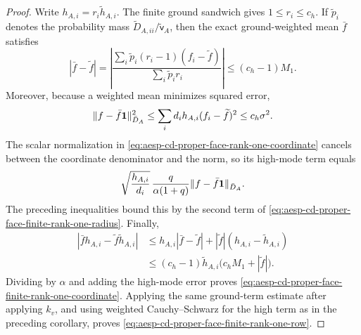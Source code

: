 \begin{proof}
Write \(h_{A,i}=r_i\widetilde h_{A,i}\).  The finite ground sandwich gives
\(1\leq r_i\leq c_h\).  If \(\widetilde p_i\) denotes the probability mass
\(\widetilde D_{A,ii}/\widetilde{\mathsf v}_A\), then the exact ground-weighted
mean \(\bar f\) satisfies
\begin{equation*}
 |\bar f-\widetilde f|
 =\left|
 \frac{\sum_i\widetilde p_i(r_i-1)(f_i-\widetilde f)}
      {\sum_i\widetilde p_i r_i}
 \right|
 \leq(c_h-1)M_1.
\end{equation*}
Moreover, because a weighted mean minimizes squared error,
\begin{equation*}
 \lVert f-\bar f\mathbf{1}\rVert_{\bar D_A}^2
 \leq\sum_i d_ih_{A,i}(f_i-\widetilde f)^2
 \leq c_h\sigma^2.
\end{equation*}
The scalar normalization in
\cref{eq:aesp-cd-proper-face-rank-one-coordinate} cancels between the
coordinate denominator and the norm, so its high-mode term equals
\begin{equation*}
 \sqrt{\frac{h_{A,i}}{d_i}}\,
 \frac{q}{\alpha(1+q)}
 \lVert f-\bar f\mathbf{1}\rVert_{\bar D_A}.
\end{equation*}
The preceding inequalities bound this by the second term of
\cref{eq:aesp-cd-proper-face-finite-rank-one-radius}.  Finally,
\begin{align*}
 |\bar f h_{A,i}-\widetilde f\widetilde h_{A,i}|
 &\leq h_{A,i}|\bar f-\widetilde f|
       +|\widetilde f|(h_{A,i}-\widetilde h_{A,i})\\
 &\leq(c_h-1)\widetilde h_{A,i}
       \bigl(c_hM_1+|\widetilde f|\bigr).
\end{align*}
Dividing by \(\alpha\) and adding the high-mode error proves
\cref{eq:aesp-cd-proper-face-finite-rank-one-coordinate}.  Applying the
same ground-term estimate after applying \(k_v\), and using weighted
Cauchy--Schwarz for the high term as in the preceding corollary, proves
\cref{eq:aesp-cd-proper-face-finite-rank-one-row}.
\end{proof}

